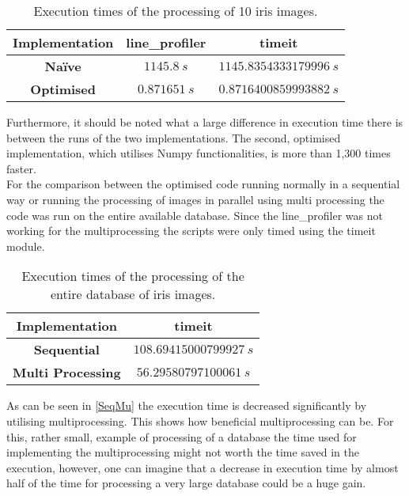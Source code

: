 \begin{table}[H]
\centering
\begin{tabular}{ |c|c|c| }
\hline
\textbf{Implementation}&\textbf{line_profiler}&\textbf{timeit} \\
\hline
\textbf{Na\"ive}&$1145.8~s$&$1145.8354333179996~s$\\
\hline
\textbf{Optimised}&$0.871651~s$&$0.8716400859993882~s$\\
\hline
\end{tabular}
\label{NaOPT}
\caption{Execution times of the processing of 10 iris images. }
\end{table}
\noindent
Furthermore, it should be noted what a large difference in execution time there is between the runs of the two implementations. The second, optimised implementation, which utilises Numpy functionalities, is more than 1,300 times faster. \\
For the comparison between the optimised code running normally in a sequential way or running the processing of images in parallel using multi processing the code was run on the entire available database. Since the line_profiler was not working for the multiprocessing the scripts were only timed using the timeit module. 
\begin{table}[H]
\centering
\begin{tabular}{ |c|c| }
\hline
\textbf{Implementation}&\textbf{timeit} \\
\hline
\textbf{Sequential}&$108.69415000799927~s$\\
\hline
\textbf{Multi Processing}&$56.29580797100061~s$\\
\hline
\end{tabular}
\label{SeqMu}
\caption{Execution times of the processing of the entire database of iris images. }
\end{table}
\noindent
As can be seen in \autoref{SeqMu} the execution time is decreased significantly by utilising multiprocessing. This shows how beneficial multiprocessing can be. For this, rather small, example of processing of a database  the time used for implementing the multiprocessing might not worth the time saved in the execution, however, one can imagine that a decrease in execution time by almost half of the time for processing a very large database could be a huge gain. 

     